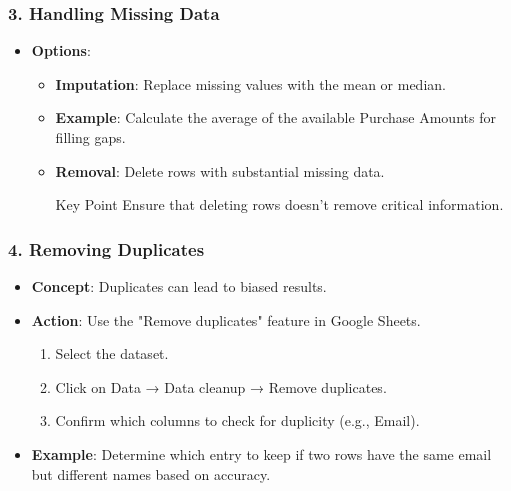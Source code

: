 \documentclass[aspectratio=169]{beamer}
\begin{document}
\begin{frame}[fragile]
    \frametitle{3. Handling Missing Data}
    \begin{itemize}
        \item \textbf{Options}:
            \begin{itemize}
                \item \textbf{Imputation}: Replace missing values with the mean or median.
                \item \textbf{Example}: Calculate the average of the available Purchase Amounts for filling gaps.
                \item \textbf{Removal}: Delete rows with substantial missing data.
                    \begin{block}{Key Point}
                        Ensure that deleting rows doesn’t remove critical information.
                    \end{block}
            \end{itemize}
    \end{itemize}
\end{frame}

\begin{frame}[fragile]
    \frametitle{4. Removing Duplicates}
    \begin{itemize}
        \item \textbf{Concept}: Duplicates can lead to biased results.
        \item \textbf{Action}: Use the "Remove duplicates" feature in Google Sheets.
            \begin{enumerate}
                \item Select the dataset.
                \item Click on Data → Data cleanup → Remove duplicates.
                \item Confirm which columns to check for duplicity (e.g., Email).
            \end{enumerate}
        \item \textbf{Example}: Determine which entry to keep if two rows have the same email but different names based on accuracy.
    \end{itemize}
\end{frame}
\end{document}
